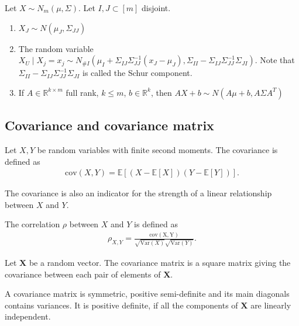 \begin{thm}
Let \( X \sim N_{m}(\mu, \Sigma) \). Let \( I,J \subset [m] \) disjoint. 
\begin{enumerate}
  \item \( X_J \sim N(\mu_J, \Sigma_{JJ}) \)
  \item The random variable \( X_U \mid X_j = x_j \sim N_{\#I}(\mu_I + \Sigma_{IJ}\Sigma_{JJ}^{-1}(x_J - \mu_J), \Sigma_{II} - \Sigma_{IJ}\Sigma_{JJ}^{-1}\Sigma_{JI}) \). Note that \(  \Sigma_{II} - \Sigma_{IJ}\Sigma_{JJ}^{-1}\Sigma_{JI} \) is called the Schur component.
  \item If \( A \in \mathbb R^{k \times m} \) full rank, \( k \leq m \), \( b \in \mathbb{R}^k \), then \( AX + b \sim N(A \mu + b, A \Sigma A^{T}) \)
\end{enumerate}
\end{thm}

\subsection{Covariance and covariance matrix}

\begin{defi}[Covariance]
  Let \( X,Y \) be random variables with finite second moments. The covariance is defined as 
  \begin{align*}
    \mathrm{cov}(X,Y) = \mathbb E[(X - \mathbb E[X])(Y - \mathbb E[Y])].
  \end{align*}
\end{defi}

The covariance is also an indicator for the strength of a linear relationship between \( X \) and \( Y \).

\begin{defi}[Correlation]
  The correlation \( \rho \) between \( X \) and \( Y \) is defined as 
  \begin{align*}
    \rho_{X,Y} = \frac{\mathrm{cov(X,Y)}}{\sqrt{\mathrm{Var}(X)} \sqrt{\mathrm{Var}(Y)}}.
  \end{align*}
\end{defi}

Let \( \mathbf X \) be a random vector. The covariance matrix is a square matrix giving the covariance between each pair of elements of \( \mathbf X \).

\begin{prop}[Properties]
  A covariance matrix is symmetric, positive semi-definite and its main diagonals contains variances. It is positive definite, if all the components of \( \mathbf X \) are linearly independent.
\end{prop}

